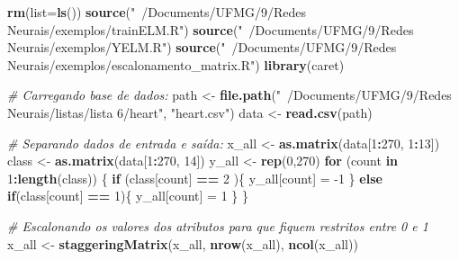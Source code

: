 \documentclass[
]{article}
\newenvironment{Shaded}{\begin{snugshade}}{\end{snugshade}}
\newcommand{\CommentTok}[1]{\textcolor[rgb]{0.56,0.35,0.01}{\textit{#1}}}
\newcommand{\ControlFlowTok}[1]{\textcolor[rgb]{0.13,0.29,0.53}{\textbf{#1}}}
\newcommand{\DataTypeTok}[1]{\textcolor[rgb]{0.13,0.29,0.53}{#1}}
\newcommand{\DecValTok}[1]{\textcolor[rgb]{0.00,0.00,0.81}{#1}}
\newcommand{\KeywordTok}[1]{\textcolor[rgb]{0.13,0.29,0.53}{\textbf{#1}}}
\newcommand{\NormalTok}[1]{#1}
\newcommand{\OperatorTok}[1]{\textcolor[rgb]{0.81,0.36,0.00}{\textbf{#1}}}
\newcommand{\StringTok}[1]{\textcolor[rgb]{0.31,0.60,0.02}{#1}}
\begin{document}
\begin{Shaded}
\begin{Highlighting}[]
\KeywordTok{rm}\NormalTok{(}\DataTypeTok{list=}\KeywordTok{ls}\NormalTok{())}
\KeywordTok{source}\NormalTok{(}\StringTok{"~/Documents/UFMG/9/Redes Neurais/exemplos/trainELM.R"}\NormalTok{)}
\KeywordTok{source}\NormalTok{(}\StringTok{"~/Documents/UFMG/9/Redes Neurais/exemplos/YELM.R"}\NormalTok{)}
\KeywordTok{source}\NormalTok{(}\StringTok{"~/Documents/UFMG/9/Redes Neurais/exemplos/escalonamento_matrix.R"}\NormalTok{)}
\KeywordTok{library}\NormalTok{(caret)}

\CommentTok{# Carregando base de dados:}
\NormalTok{path <-}\StringTok{ }\KeywordTok{file.path}\NormalTok{(}\StringTok{"~/Documents/UFMG/9/Redes Neurais/listas/lista 6/heart"}\NormalTok{, }\StringTok{"heart.csv"}\NormalTok{)}
\NormalTok{data <-}\StringTok{ }\KeywordTok{read.csv}\NormalTok{(path)}

\CommentTok{# Separando dados de entrada e saída:}
\NormalTok{x_all <-}\StringTok{ }\KeywordTok{as.matrix}\NormalTok{(data[}\DecValTok{1}\OperatorTok{:}\DecValTok{270}\NormalTok{, }\DecValTok{1}\OperatorTok{:}\DecValTok{13}\NormalTok{])}
\NormalTok{class <-}\StringTok{ }\KeywordTok{as.matrix}\NormalTok{(data[}\DecValTok{1}\OperatorTok{:}\DecValTok{270}\NormalTok{, }\DecValTok{14}\NormalTok{])}
\NormalTok{y_all <-}\StringTok{ }\KeywordTok{rep}\NormalTok{(}\DecValTok{0}\NormalTok{,}\DecValTok{270}\NormalTok{)}
\ControlFlowTok{for}\NormalTok{ (count }\ControlFlowTok{in} \DecValTok{1}\OperatorTok{:}\KeywordTok{length}\NormalTok{(class)) \{}
  \ControlFlowTok{if}\NormalTok{ (class[count] }\OperatorTok{==}\StringTok{ }\DecValTok{2}\NormalTok{ )\{}
\NormalTok{    y_all[count] =}\StringTok{ }\DecValTok{-1}
\NormalTok{  \}}
  \ControlFlowTok{else} \ControlFlowTok{if}\NormalTok{(class[count] }\OperatorTok{==}\StringTok{ }\DecValTok{1}\NormalTok{)\{}
\NormalTok{    y_all[count] =}\StringTok{ }\DecValTok{1}
\NormalTok{  \}}
\NormalTok{\}}

\CommentTok{# Escalonando os valores dos atributos para que fiquem restritos entre 0 e 1}
\NormalTok{x_all <-}\StringTok{ }\KeywordTok{staggeringMatrix}\NormalTok{(x_all, }\KeywordTok{nrow}\NormalTok{(x_all), }\KeywordTok{ncol}\NormalTok{(x_all))}


\end{Highlighting}
\end{Shaded}
\end{document}
